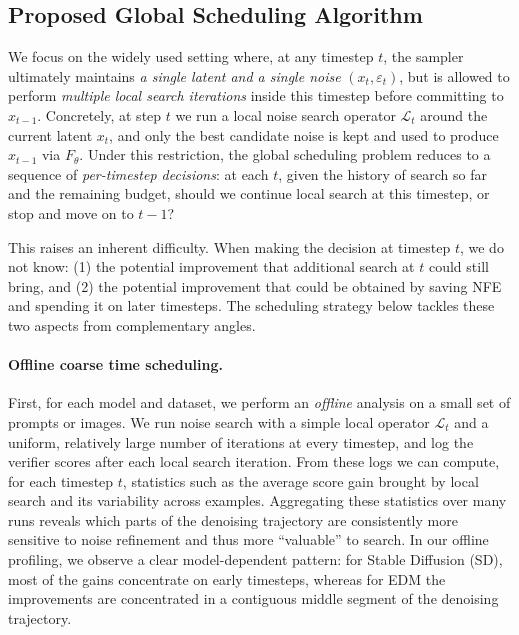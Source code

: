 \subsection{Proposed Global Scheduling Algorithm}
\label{sec:method-ours}

We focus on the widely used setting where, at any timestep $t$,
the sampler ultimately maintains \emph{a single latent and a single noise}
$(x_t, \varepsilon_t)$, but is allowed to perform \emph{multiple local search
iterations} inside this timestep before committing to $x_{t-1}$.
Concretely, at step $t$ we run a local noise search operator $\mathcal{L}_t$
around the current latent $x_t$, and only the best candidate noise is kept and
used to produce $x_{t-1}$ via $F_\theta$.
Under this restriction, the global scheduling problem reduces to a sequence of
\emph{per-timestep decisions}: at each $t$, given the history of search so far
and the remaining budget, should we continue local search at this timestep,
or stop and move on to $t-1$?

This raises an inherent difficulty.
When making the decision at timestep $t$, we do not know:
(1) the potential improvement that additional search at $t$ could still bring,
and (2) the potential improvement that could be obtained by saving NFE and
spending it on later timesteps.
The scheduling strategy below tackles these two aspects
from complementary angles.

\paragraph{Offline coarse time scheduling.}
First, for each model and dataset, we perform an \emph{offline} analysis on a
small set of prompts or images.
We run noise search with a simple local operator $\mathcal{L}_t$ and a uniform,
relatively large number of iterations at every timestep, and log the verifier
scores after each local search iteration.
From these logs we can compute, for each timestep $t$, statistics such as the
average score gain brought by local search and its variability across examples.
Aggregating these statistics over many runs reveals which parts of the
denoising trajectory are consistently more sensitive to noise refinement and
thus more ``valuable'' to search.
In our offline profiling, we observe a clear model-dependent pattern:
for Stable Diffusion (SD), most of the gains concentrate on early timesteps,
whereas for EDM the improvements are concentrated in a contiguous middle segment
of the denoising trajectory.

